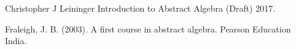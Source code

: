 \documentclass[11pt,a4paper]{article}
\begin{document}
\begin{thebibliography}{1}
    Christopher J Leininger  \newblock Introduction to Abstract Algebra
    (Draft)  2017.

    Fraleigh, J. B. (2003). A first course in abstract algebra. Pearson Education India.
\end{thebibliography}
\end{document}
